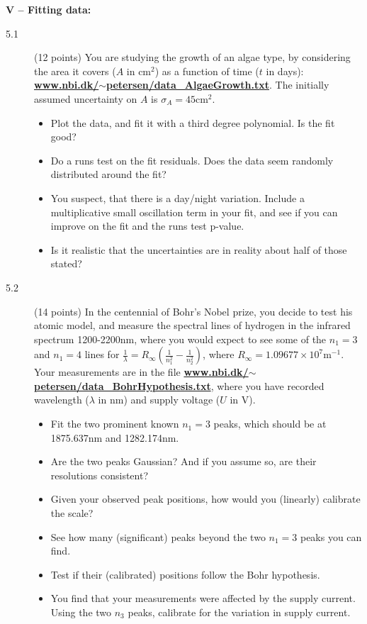 \documentclass[11pt]{article}
\begin{document}

\noindent
{\bf V -- Fitting data:}
\begin{description}
\item[5.1] (12 points)
  You are studying the growth of an algae type, by considering the area it covers ($A$ in $\mbox{cm}^2$)
  as a function of time ($t$ in days):
  \href{http://www.nbi.dk/~petersen/data\_AlgaeGrowth.txt}{\bf www.nbi.dk/$\sim$petersen/data\_AlgaeGrowth.txt}.
  The initially assumed uncertainty on $A$ is $\sigma_A = 45 \mbox{cm}^2$.
  \vspace{-1.0ex}
  \begin{itemize}
    \item Plot the data, and fit it with a third degree polynomial. Is the fit good?
    \item Do a runs test on the fit residuals. Does the data seem randomly distributed around the fit?
    \item You suspect, that there is a day/night variation. Include a multiplicative small oscillation term in
      your fit, and see if you can improve on the fit and the runs test p-value.
    \item Is it realistic that the uncertainties are in reality about half of those stated?
  \end{itemize}
%
\item[5.2] (14 points)
  In the centennial of Bohr's Nobel prize, you decide to test his atomic model, and measure the spectral
  lines of hydrogen in the infrared spectrum 1200-2200nm, where you would expect to see some of the
  $n_1 = 3$ and $n_1 = 4$ lines for $\frac{1}{\lambda} = R_{\infty} \left( \frac{1}{n_1^2} - \frac{1}{n_2^2} \right)$,
  where $R_{\infty} = 1.09677 \times 10^7 \mbox{m}^{-1}$.
  Your measurements are in the file \href{http://www.nbi.dk/~petersen/data\_BohrHypothesis.txt}{\bf www.nbi.dk/$\sim$petersen/data\_BohrHypothesis.txt}, where you have recorded wavelength ($\lambda$ in nm) and supply voltage ($U$ in V).
  \vspace*{-1ex}
  \begin{itemize}
    \item Fit the two prominent known $n_1 = 3$ peaks, which should be at 1875.637nm and 1282.174nm.
    \item Are the two peaks Gaussian? And if you assume so, are their resolutions consistent?
    \item Given your observed peak positions, how would you (linearly) calibrate the scale?
    \item See how many (significant) peaks beyond the two $n_1 = 3$ peaks you can find.
    \item Test if their (calibrated) positions follow the Bohr hypothesis.
    \item You find that your measurements were affected by the supply current. Using the two $n_3$ peaks,
      calibrate for the variation in supply current.
  \end{itemize}
\vspace*{-2ex}
\end{description}
\end{document}
